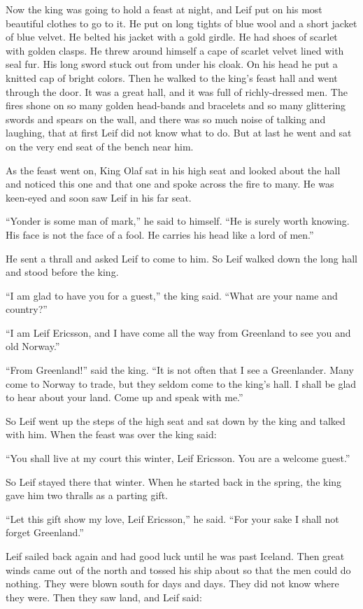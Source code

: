 Now the king was going to hold a feast at night, and Leif put on his
most beautiful clothes to go to it. He put on long tights of blue wool
and a short jacket of blue velvet. He belted his jacket with a gold
girdle. He had shoes of scarlet with golden clasps. He threw around
himself a cape of scarlet velvet lined with seal fur. His long sword
stuck out from under his cloak. On his head he put a knitted cap of
bright colors. Then he walked to the king's feast hall and went through
the door. It was a great hall, and it was full of richly-dressed men.
The fires shone on so many golden head-bands and bracelets and so many
glittering swords and spears on the wall, and there was so much noise of
talking and laughing, that at first Leif did not know what to do. But at
last he went and sat on the very end seat of the bench near him.

As the feast went on, King Olaf sat in his high seat and looked about
the hall and noticed this one and that one and spoke across the fire to
many. He was keen-eyed and soon saw Leif in his far seat.

``Yonder is some man of mark,'' he said to himself. ``He is surely worth
knowing. His face is not the face of a fool. He carries his head like a
lord of men.''

He sent a thrall and asked Leif to come to him. So Leif walked down the
long hall and stood before the king.

``I am glad to have you for a guest,'' the king said. ``What are your
name and country?''

``I am Leif Ericsson, and I have come all the way from Greenland to see
you and old Norway.''

``From Greenland!'' said the king. ``It is not often that I see a
Greenlander. Many come to Norway to trade, but they seldom come to the
king's hall. I shall be glad to hear about your land. Come up and speak
with me.''

So Leif went up the steps of the high seat and sat down by the king and
talked with him. When the feast was over the king said:

``You shall live at my court this winter, Leif Ericsson. You are a
welcome guest.''

So Leif stayed there that winter. When he started back in the spring,
the king gave him two thralls as a parting gift.

``Let this gift show my love, Leif Ericsson,'' he said. ``For your sake
I shall not forget Greenland.''

Leif sailed back again and had good luck until he was past Iceland. Then
great winds came out of the north and tossed his ship about so that the
men could do nothing. They were blown south for days and days. They did
not know where they were. Then they saw land, and Leif said:

